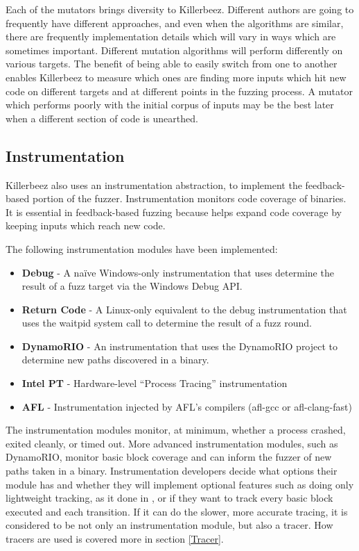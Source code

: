 Each of the mutators brings diversity to Killerbeez.  Different authors are
going to frequently have different approaches, and even when the algorithms
are similar, there are frequently implementation details which will vary in
ways which are sometimes important.  Different mutation algorithms will
perform differently on various targets.  The benefit of being able to easily
switch from one to another enables Killerbeez to measure which ones are finding
more inputs which hit new code on different targets and at different points in
the fuzzing process.  A mutator which performs poorly with the initial corpus
of inputs may be the best later when a different section of code is unearthed.

\subsection{Instrumentation} \label{Instrumentation}
Killerbeez also uses an instrumentation abstraction, to implement the
feedback-based portion of the fuzzer. Instrumentation monitors code coverage of
binaries. It is essential in feedback-based fuzzing because helps expand code
coverage by keeping inputs which reach new code.

The following instrumentation modules have been implemented:
\begin{itemize}[noitemsep]
\item \textbf{Debug} - A na\"ive Windows-only instrumentation that uses determine the
	result of a fuzz target via the Windows Debug API.
\item \textbf{Return Code} - A Linux-only equivalent to the debug instrumentation that
	uses the waitpid system call to determine the result of a fuzz round.
\item \textbf{DynamoRIO} - An instrumentation that uses the DynamoRIO project to
	determine new paths discovered in a binary.
\item \textbf{Intel PT} - Hardware-level ``Process Tracing'' instrumentation
\item \textbf{AFL} - Instrumentation injected by AFL's compilers (afl-gcc or
	afl-clang-fast)
\end{itemize}

The instrumentation modules monitor, at minimum, whether a process crashed,
exited cleanly, or timed out. More advanced instrumentation modules, such as
DynamoRIO, monitor basic block coverage and can inform the fuzzer of new paths
taken in a binary.  Instrumentation developers decide what options their
module has and whether they will implement optional features such as doing
only lightweight tracking, as it done in \AFL{}, or if they want to track every
basic block executed and each transition.  If it can do the slower, more
accurate tracing, it is considered to be not only an instrumentation module,
but also a tracer.  How tracers are used is covered more in section
\ref{Tracer}.

